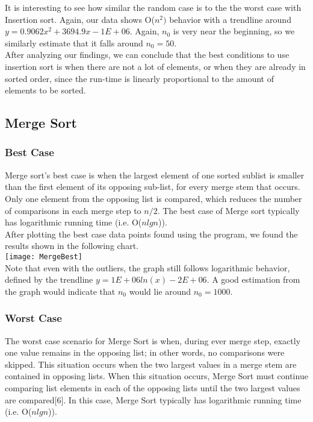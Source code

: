 \documentclass[12pt]{article}
\begin{document}
It is interesting to see how similar the random case is to the the worst case with Insertion sort. Again, our data shows O($n^2)$ behavior with a trendline around $y = 0.9062x^2 + 3694.9x - 1E+06$. Again, $n_0$ is very near the beginning, so we similarly estimate that it falls around $n_0 = 50$.\\

After analyzing our findings, we can conclude that the best conditions to use insertion sort is when there are not a lot of elements, or when they are already in sorted order, since the run-time is linearly proportional to the amount of elements to be sorted. \\

\subsection*{Merge Sort}

\subsubsection*{Best Case}

Merge sort's best case is when the largest element of one sorted sublist is smaller than the first element of its opposing sub-list, for every merge stem that occurs. Only one element from the opposing list is compared, which reduces the number of comparisons in each merge step to $n/2$. The best case of Merge sort typically has logarithmic running time (i.e. O($nlgn$)).\\

After plotting the best case data points found using the program, we found the results shown in the following chart. \\

\texttt{[image: MergeBest]}\\

Note that even with the outliers, the graph still follows logarithmic behavior, defined by the trendline $y = 1E+06ln(x) - 2E+06$. A good estimation from the graph would indicate that $n_0$ would lie around $n_0 = 1000 $.
\subsubsection*{Worst  Case}

The worst case scenario for Merge Sort is when, during ever merge step, exactly one value remains in the opposing list; in other words, no comparisons were skipped. This situation occurs when the two largest values in a merge stem are contained in opposing lists. When this situation occurs, Merge Sort must continue comparing list elements in each of the opposing lists until the two largest values are compared[6]. In this case, Merge Sort typically has logarithmic running time (i.e. O($nlgn$)).\\
\end{document}

